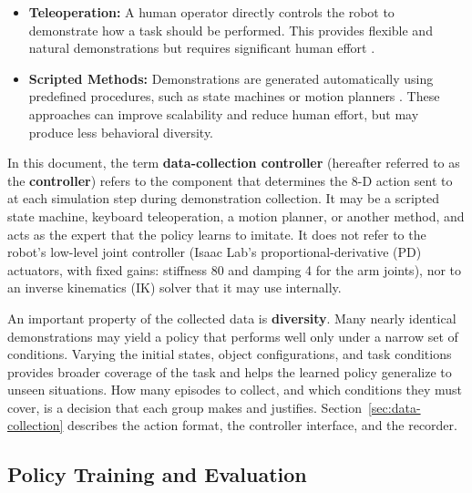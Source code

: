 \documentclass[11pt]{article}
\DeclareRobustCommand{\code}{\codeurl}  %
\begin{document}
\begin{itemize}
\item \textbf{Teleoperation:} A human operator directly controls the robot to demonstrate how a task should be performed.
      This provides flexible and natural demonstrations but requires significant human effort \cite{wikipediaTeleoperation}.
\item \textbf{Scripted Methods:} Demonstrations are generated automatically using predefined procedures,
      such as state machines \cite{mdnStateMachine} or motion planners \cite{wikipediaMotionPlanning}. These approaches can
      improve scalability and reduce human effort, but may produce less behavioral diversity.
\end{itemize}

In this document, the term \textbf{data-collection controller} (hereafter referred to as the \textbf{controller}) refers to the component that determines the 8-D action sent to \code{env.step()} at each simulation step during demonstration collection. It may be a scripted state machine, keyboard teleoperation, a motion planner, or another method, and acts as the expert that the policy learns to imitate. It does not refer to the robot's low-level joint controller (Isaac Lab's proportional-derivative (PD) actuators, with fixed gains: stiffness 80 and damping 4 for the arm joints), nor to an inverse kinematics (IK) solver that it may use internally.

An important property of the collected data is \textbf{diversity}. Many nearly identical demonstrations may yield a
policy that performs well only under a narrow set of conditions. Varying the initial states, object configurations,
and task conditions provides broader coverage of the task and helps the learned policy generalize to unseen
situations. How many episodes to collect, and which conditions they must cover, is a decision that each group makes
and justifies. Section~\ref{sec:data-collection} describes the action format, the controller interface, and the recorder.


\subsection{Policy Training and Evaluation}
\label{sec:policies-concept}
\end{document}
